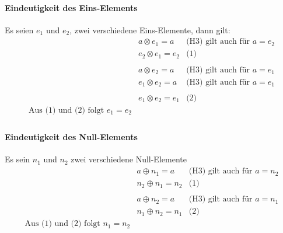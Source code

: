 \documentclass[a4paper]{scrartcl}
\begin{document}
				\paragraph{Eindeutigkeit des Eins-Elements}
				Es seien \(e_1\) und \(e_2\), zwei verschiedene Eins-Elemente, dann gilt:
				\begin{align*}
						&a \otimes e_1 = a &  \text{(H3) gilt auch für } a = e_2\\
						&e_2 \otimes e_1 = e_2 &\text{(1)}\\
						\\
						& a \otimes e_2 = a & \text{(H3) gilt auch für } a = e_1\\
						&e_1 \otimes e_2 = a & \text{(H3) gilt auch für } a = e_1\\
						\\
						&e_1 \otimes e_2 = e_1 &\text{(2)} \\
						\text{Aus (1) und (2) folgt } e_1 = e_2&\\
				\end{align*}
				
				\paragraph{Eindeutigkeit des Null-Elements}
				Es sein \(n_1\) und \(n_2\) zwei verschiedene Null-Elemente
				\begin{align*}
					&a \oplus n_1 = a & \text{(H3) gilt auch für } a = n_2\\
					&n_2 \oplus n_1 = n_2 &\text{(1)}\\
					\\
					& a \oplus n_2 = a & \text{(H3) gilt auch für } a = n_1\\
					& n_1 \oplus n_2 = n_1 & \text{(2)}\\
					\text{Aus (1) und (2) folgt } n_1 = n_2\\
				\end{align*}
				
\end{document}
